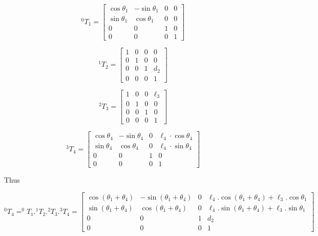 \begin{equation}
    ^{0}T_{1} = 
    \begin{bmatrix}
    \cos\theta_1 & -\sin\theta_1 & 0 & 0 \\
    \sin\theta_1 & \cos\theta_1 & 0 & 0 \\
    0 & 0 & 1 & 0 \\
    0 & 0 & 0 & 1
    \end{bmatrix}
\end{equation}

\begin{equation}
    ^{1}T_{2} = 
    \begin{bmatrix}
    1 & 0 & 0 & 0 \\
    0 & 1 & 0 & 0 \\
    0 & 0 & 1 & d_2 \\
    0 & 0 & 0 & 1
    \end{bmatrix}
\end{equation}

\begin{equation}
    ^{2}T_{3} = 
    \begin{bmatrix}
    1 & 0 & 0 & \ell_3 \\
    0 & 1 & 0 & 0 \\
    0 & 0 & 1 & 0 \\
    0 & 0 & 0 & 1
    \end{bmatrix}
\end{equation}

\begin{equation}
    ^{3}T_{4} = 
    \begin{bmatrix}
    \cos\theta_4 & -\sin\theta_4 & 0 & \ell_4\cdot\cos\theta_4 \\
    \sin\theta_4 & \cos\theta_4 & 0 & \ell_4\cdot\sin\theta_4 \\
    0 & 0 & 1 & 0 \\
    0 & 0 & 0 & 1
    \end{bmatrix}
\end{equation}

Thus

\begin{equation*}
    ^{0}T_{4} = ^{0}T_{1}.^{1}T_{2}.^{2}T_{3}.^{3}T_{4}
    = 
    \begin{bmatrix}
    \cos(\theta_1 + \theta_4) & -\sin(\theta_1 + \theta_4) & 0 & \ell_4.\cos(\theta_1 + \theta_4) + \ell_3.\cos\theta_1 \\
    \sin(\theta_1 + \theta_4) & \cos(\theta_1 + \theta_4) & 0 & \ell_4.\sin(\theta_1 + \theta_4) + \ell_3.\sin\theta_1 \\
    0 & 0 & 1 & d_2 \\
    0 & 0 & 0 & 1
    \end{bmatrix}
\end{equation*}

